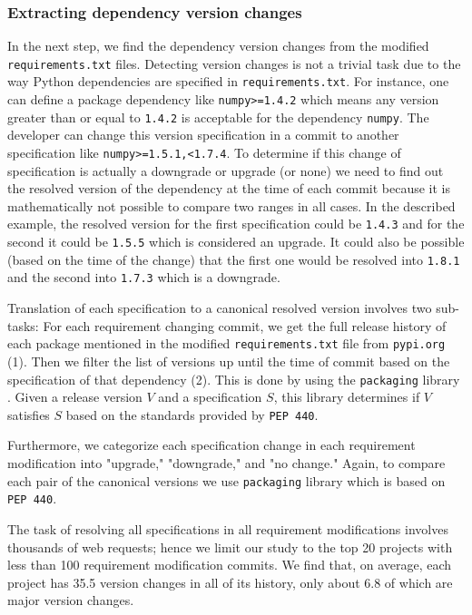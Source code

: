 \documentclass[conference]{IEEEtran}
\begin{document}
\subsubsection{Extracting dependency version changes}
In the next step, we find the dependency version changes from the modified \texttt{requirements.txt} files. Detecting version changes is not a trivial task due to the way Python dependencies are specified in \texttt{requirements.txt}. For instance, one can define a package dependency like \texttt{numpy>=1.4.2} which means any version greater than or equal to \texttt{1.4.2} is acceptable for the dependency \texttt{numpy}. The developer can change this version specification in a commit to another specification like \texttt{numpy>=1.5.1,<1.7.4}. To determine if this change of specification is actually a downgrade or upgrade (or none) we need to find out the resolved version of the dependency at the time of each commit because it is mathematically not possible to compare two ranges in all cases. In the described example, the resolved version for the first specification could be \texttt{1.4.3} and for the second it could be \texttt{1.5.5} which is considered an upgrade. It could also be possible (based on the time of the change) that the first one would be resolved into \texttt{1.8.1} and the second into \texttt{1.7.3} which is a downgrade. 

Translation of each specification to a canonical resolved version involves two sub-tasks: For each requirement changing commit, we get the full release history of each package mentioned in the modified \texttt{requirements.txt} file from \texttt{pypi.org} (1). Then we filter the list of versions up until the time of commit based on the specification of that dependency (2). This is done by using the \texttt{packaging} library \cite{packaging}. Given a release version $V$ and a specification $S$, this library determines if $V$ satisfies $S$ based on the standards provided by \texttt{PEP 440}\cite{pep440}.

Furthermore, we categorize each specification change in each requirement modification into "upgrade," "downgrade," and "no change." 
Again, to compare each pair of the canonical versions we use \texttt{packaging} library which is based on \texttt{PEP 440}. 

The task of resolving all specifications in all requirement modifications involves thousands of web requests; hence we limit our study to the top 20 projects with less than 100 requirement modification commits. We find that, on average, each project has 35.5 version changes in all of its history, only about 6.8 of which are major version changes.
\end{document}
